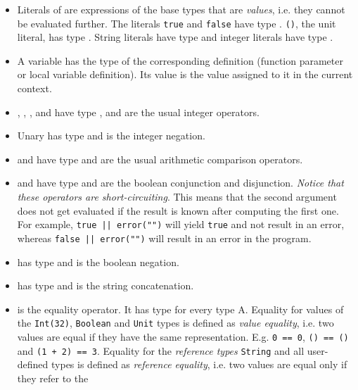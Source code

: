 \begin{itemize}
    \item Literals of \langname are expressions of the base types that are \emph{values},
        i.e. they cannot be evaluated further.
        The literals \lstinline{true} and \lstinline{false} have type \Boolean.
        \lstinline{()}, the unit literal, has type \Unit.
        String literals have type \String and integer literals have type \Int.
    \item A variable has the type of the corresponding definition
        (function parameter or local variable definition).
        Its value is the value assigned to it in the current context.
    \item \gtns{+}, \gtns{-}, \gtns{*}, \gtns{/} and \gtns{\%} have type \typeII{\Int}{\Int}{\Int},
        and are the usual integer operators.
    \item Unary \gtns{-} has type \typeI{\Int}{\Int} and is the integer negation.
    \item \gtns{<} and \gtns{<=} have type \typeII{\Int}{\Int}{\Boolean} and are the usual arithmetic
        comparison operators.
    \item \gtns{\&\&} and \gtns{||} have type \typeII{\Boolean}{\Boolean}{\Boolean}
        and are the boolean conjunction and disjunction. \emph{Notice that these operators
        are short-circuiting}. This means that the second argument does not get evaluated
        if the result is known after computing the first one.
        For example, \lstinline{true || error("")} will yield \lstinline{true} and not result in an error,
        whereas \lstinline{false || error("")} will result in an error in the program.
    \item \gtns{!} has type \typeI{\Boolean}{\Boolean} and is the boolean negation.
    \item \gtns{++} has type \typeII{\String}{\String}{\String} and is the string concatenation.
    \item \gtns{==} is the equality operator. It has type  for every type A.
        Equality for values of the \lstinline{Int(32)}, \lstinline{Boolean} and \lstinline{Unit} types
        is defined as \emph{value equality}, i.e. two values are equal if they have the
        same representation. E.g. \lstinline{0 == 0}, \lstinline{() == ()} and \lstinline{(1 + 2) == 3}.
        Equality for the \emph{reference types} \lstinline{String} and all user-defined types
        is defined as \emph{reference equality}, i.e. two values are equal only if they refer to the

\end{itemize}

